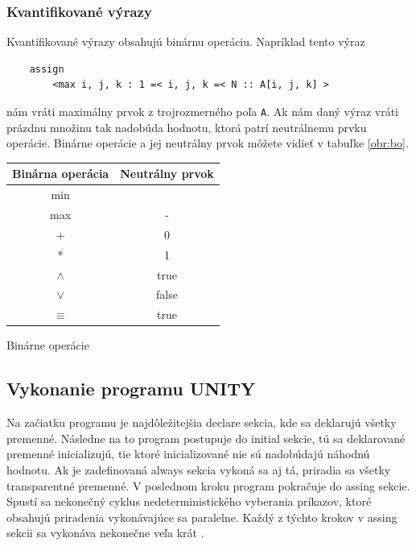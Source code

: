 \subsubsection{Kvantifikované výrazy}

\vspace{5mm}
Kvantifikované výrazy obsahujú binárnu operáciu. Napríklad tento výraz
\begin{lstlisting}
	assign
		<max i, j, k : 1 =< i, j, k =< N :: A[i, j, k] >
\end{lstlisting}
nám vráti maximálny prvok z trojrozmerného poľa \texttt{A}. Ak nám daný výraz vráti prázdnu množinu tak 
nadobúda hodnotu, ktorá patrí neutrálnemu prvku operácie. Binárne operácie a jej neutrálny prvok 
môžete vidieť v tabuľke \ref{obr:bo}.

\begin{center}
	\begin{tabular}{|c|c|}
		\hline
		Binárna operácia & Neutrálny prvok \\
		\hline
		min              & \infinity       \\
		\hline
		max              & -\infinity      \\
		\hline
		+                & 0               \\
		\hline
		*                & 1               \\
		\hline
		$\land$          & true            \\
		\hline
		$\vee$           & false           \\
		\hline
		$\equiv$         & true            \\
		\hline
	\end{tabular}
	\begin{table}[!h]
		\caption[Binárne operácie]{Binárne operácie}
		\label{obr:bo}
	\end{table}
\end{center}

\subsection{Vykonanie programu UNITY}
Na začiatku programu je najdôležitejšia declare sekcia, kde sa deklarujú všetky premenné. 
Následne na to program postupuje do initial sekcie, tú sa deklarované premenné inicializujú, tie ktoré 
inicializované nie sú nadobúdajú náhodnú hodnotu. Ak je zadefinovaná always sekcia vykoná sa aj tá, 
priradia sa všetky transparentné premenné. V poslednom kroku program pokračuje do assing sekcie.
Spustí sa nekonečný cyklus nedeterministického vyberania príkazov, ktoré obsahujú priradenia 
vykonávajúce sa paralelne. Každý z týchto krokov v assing sekcii sa vykonáva nekonečne veľa krát \cite{br2}.

